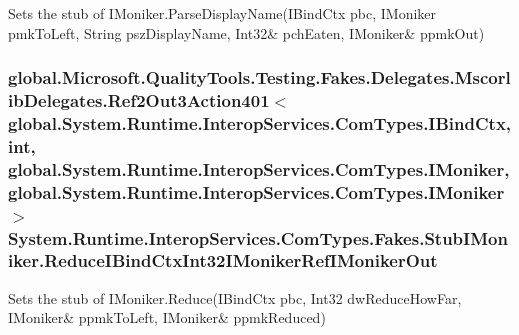 Sets the stub of I\-Moniker.\-Parse\-Display\-Name(I\-Bind\-Ctx pbc, I\-Moniker pmk\-To\-Left, String psz\-Display\-Name, Int32\& pch\-Eaten, I\-Moniker\& ppmk\-Out)

\hypertarget{class_system_1_1_runtime_1_1_interop_services_1_1_com_types_1_1_fakes_1_1_stub_i_moniker_af7d7fa515c33d4cb15c54dc72508a8e4}{
\subsubsection[{Reduce\-I\-Bind\-Ctx\-Int32\-I\-Moniker\-Ref\-I\-Moniker\-Out}]{\setlength{\rightskip}{0pt plus 5cm}global.\-Microsoft.\-Quality\-Tools.\-Testing.\-Fakes.\-Delegates.\-Mscorlib\-Delegates.\-Ref2\-Out3\-Action401$<$global.\-System.\-Runtime.\-Interop\-Services.\-Com\-Types.\-I\-Bind\-Ctx, int, global.\-System.\-Runtime.\-Interop\-Services.\-Com\-Types.\-I\-Moniker, global.\-System.\-Runtime.\-Interop\-Services.\-Com\-Types.\-I\-Moniker$>$ System.\-Runtime.\-Interop\-Services.\-Com\-Types.\-Fakes.\-Stub\-I\-Moniker.\-Reduce\-I\-Bind\-Ctx\-Int32\-I\-Moniker\-Ref\-I\-Moniker\-Out}}\label{class_system_1_1_runtime_1_1_interop_services_1_1_com_types_1_1_fakes_1_1_stub_i_moniker_af7d7fa515c33d4cb15c54dc72508a8e4}


Sets the stub of I\-Moniker.\-Reduce(I\-Bind\-Ctx pbc, Int32 dw\-Reduce\-How\-Far, I\-Moniker\& ppmk\-To\-Left, I\-Moniker\& ppmk\-Reduced)

